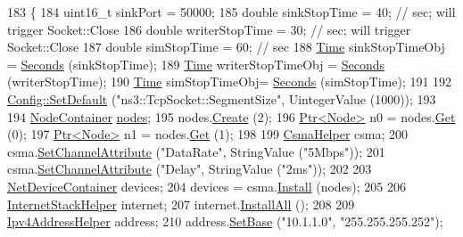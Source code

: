 \begin{DoxyCode}
183 \{
184   uint16\_t sinkPort = 50000;
185   \textcolor{keywordtype}{double} sinkStopTime = 40;  \textcolor{comment}{// sec; will trigger Socket::Close}
186   \textcolor{keywordtype}{double} writerStopTime = 30;  \textcolor{comment}{// sec; will trigger Socket::Close}
187   \textcolor{keywordtype}{double} simStopTime = 60;  \textcolor{comment}{// sec}
188   \hyperlink{classns3_1_1Time}{Time} sinkStopTimeObj = \hyperlink{group__timecivil_ga33c34b816f8ff6628e33d5c8e9713b9e}{Seconds} (sinkStopTime);
189   \hyperlink{classns3_1_1Time}{Time} writerStopTimeObj = \hyperlink{group__timecivil_ga33c34b816f8ff6628e33d5c8e9713b9e}{Seconds} (writerStopTime);
190   \hyperlink{classns3_1_1Time}{Time} simStopTimeObj= \hyperlink{group__timecivil_ga33c34b816f8ff6628e33d5c8e9713b9e}{Seconds} (simStopTime);
191 
192   \hyperlink{group__config_ga2e7882df849d8ba4aaad31c934c40c06}{Config::SetDefault} (\textcolor{stringliteral}{"ns3::TcpSocket::SegmentSize"}, UintegerValue (1000));
193 
194   \hyperlink{classns3_1_1NodeContainer}{NodeContainer} \hyperlink{visualizer-ideas_8txt_a3e1b3808014a2c68ab0cd0182e041be2}{nodes};
195   nodes.\hyperlink{classns3_1_1NodeContainer_a787f059e2813e8b951cc6914d11dfe69}{Create} (2);
196   \hyperlink{classns3_1_1Ptr}{Ptr<Node>} n0 = nodes.\hyperlink{classns3_1_1NodeContainer_a9ed96e2ecc22e0f5a3d4842eb9bf90bf}{Get} (0);
197   \hyperlink{classns3_1_1Ptr}{Ptr<Node>} n1 = nodes.\hyperlink{classns3_1_1NodeContainer_a9ed96e2ecc22e0f5a3d4842eb9bf90bf}{Get} (1);
198 
199   \hyperlink{classns3_1_1CsmaHelper}{CsmaHelper} csma;
200   csma.\hyperlink{classns3_1_1CsmaHelper_a886d900b2fe44433e0b81752dea7e7f1}{SetChannelAttribute} (\textcolor{stringliteral}{"DataRate"}, StringValue (\textcolor{stringliteral}{"5Mbps"}));
201   csma.\hyperlink{classns3_1_1CsmaHelper_a886d900b2fe44433e0b81752dea7e7f1}{SetChannelAttribute} (\textcolor{stringliteral}{"Delay"}, StringValue (\textcolor{stringliteral}{"2ms"}));
202 
203   \hyperlink{classns3_1_1NetDeviceContainer}{NetDeviceContainer} devices;
204   devices = csma.\hyperlink{classns3_1_1CsmaHelper_af79a91372595230b0817200270ab84e7}{Install} (nodes);
205 
206   \hyperlink{classns3_1_1InternetStackHelper}{InternetStackHelper} internet;
207   internet.\hyperlink{classns3_1_1InternetStackHelper_a6cfa73782fd4071c4cfbd73ebf1bbb44}{InstallAll} ();
208 
209   \hyperlink{classns3_1_1Ipv4AddressHelper}{Ipv4AddressHelper} address;
210   address.\hyperlink{classns3_1_1Ipv4AddressHelper_acf7b16dd25bac67e00f5e25f90a9a035}{SetBase} (\textcolor{stringliteral}{"10.1.1.0"}, \textcolor{stringliteral}{"255.255.255.252"});

\end{DoxyCode}
